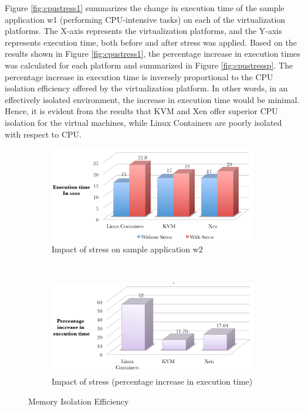 Figure \ref{fig:cpustress1} summarizes the change in execution time of the sample application w1 (performing CPU-intensive tasks) on each of the virtualization platforms. The X-axis represents the virtualization platforms, and the Y-axis represents execution time, both before and after stress was applied. Based on the results shown in Figure \ref{fig:cpustress1}, the percentage increase in execution times was calculated for each platform and summarized in Figure \ref{fig:cpustressp}. The percentage increase in execution time is inversely proportional to the CPU isolation efficiency offered by the virtualization platform. In other words, in an effectively isolated environment, the increase in execution time would be minimal. Hence, it is evident from the results that KVM and Xen offer superior CPU isolation for the virtual machines, while Linux Containers are poorly isolated with respect to CPU.

\begin{figure}[H]
        \centering
        \begin{subfigure}[b]{0.99\textwidth}
                \includegraphics[width=\textwidth]{memstress.png}
                \caption{Impact of stress on sample application w2}
                \label{fig:memstress1}
        \end{subfigure}%
        ~ %
        \qquad \newline %
        \begin{subfigure}[b]{0.8\textwidth}
                \includegraphics[width=\textwidth]{memstressp.png}
                \caption{Impact of stress (percentage increase in execution time)}
                \label{fig:memstressp}
        \end{subfigure}
        \caption{Memory Isolation Efficiency}\label{fig:memisolation}
\end{figure}

